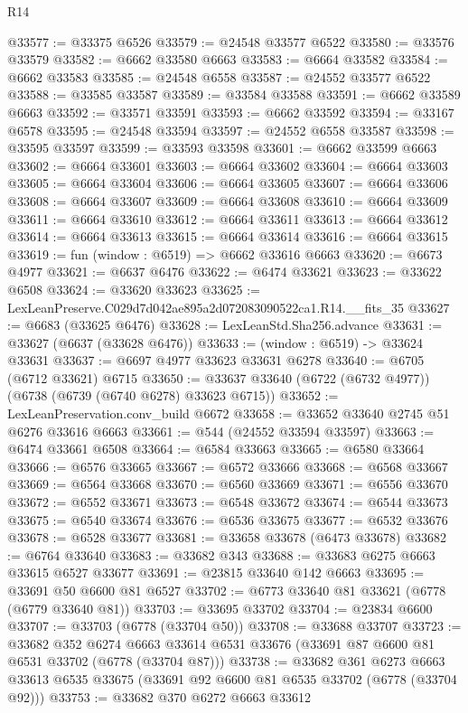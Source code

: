 \begin{lexlean}{R14}
\begin{coremodule}
@33577 := @33375 @6526
@33579 := @24548 @33577 @6522
@33580 := @33576 @33579
@33582 := @6662 @33580 @6663
@33583 := @6664 @33582
@33584 := @6662 @33583
@33585 := @24548 @6558
@33587 := @24552 @33577 @6522
@33588 := @33585 @33587
@33589 := @33584 @33588
@33591 := @6662 @33589 @6663
@33592 := @33571 @33591
@33593 := @6662 @33592
@33594 := @33167 @6578
@33595 := @24548 @33594
@33597 := @24552 @6558 @33587
@33598 := @33595 @33597
@33599 := @33593 @33598
@33601 := @6662 @33599 @6663
@33602 := @6664 @33601
@33603 := @6664 @33602
@33604 := @6664 @33603
@33605 := @6664 @33604
@33606 := @6664 @33605
@33607 := @6664 @33606
@33608 := @6664 @33607
@33609 := @6664 @33608
@33610 := @6664 @33609
@33611 := @6664 @33610
@33612 := @6664 @33611
@33613 := @6664 @33612
@33614 := @6664 @33613
@33615 := @6664 @33614
@33616 := @6664 @33615
@33619 := fun (window : @6519) => @6662 @33616 @6663
@33620 := @6673 @4977
@33621 := @6637 @6476
@33622 := @6474 @33621
@33623 := @33622 @6508
@33624 := @33620 @33623
@33625 := LexLeanPreserve.C029d7d042ae895a2d072083090522ca1.R14.__fits_35
@33627 := @6683 (@33625 @6476)
@33628 := LexLeanStd.Sha256.advance
@33631 := @33627 (@6637 (@33628 @6476))
@33633 := (window : @6519) -> @33624 @33631
@33637 := @6697 @4977 @33623 @33631 @6278
@33640 := @6705 (@6712 @33621) @6715
@33650 := @33637 @33640 (@6722 (@6732 @4977)) (@6738 (@6739 (@6740 @6278) @33623 @6715))
@33652 := LexLeanPreservation.conv_build @6672
@33658 := @33652 @33640 @2745 @51 @6276 @33616 @6663
@33661 := @544 (@24552 @33594 @33597)
@33663 := @6474 @33661 @6508
@33664 := @6584 @33663
@33665 := @6580 @33664
@33666 := @6576 @33665
@33667 := @6572 @33666
@33668 := @6568 @33667
@33669 := @6564 @33668
@33670 := @6560 @33669
@33671 := @6556 @33670
@33672 := @6552 @33671
@33673 := @6548 @33672
@33674 := @6544 @33673
@33675 := @6540 @33674
@33676 := @6536 @33675
@33677 := @6532 @33676
@33678 := @6528 @33677
@33681 := @33658 @33678 (@6473 @33678)
@33682 := @6764 @33640
@33683 := @33682 @343
@33688 := @33683 @6275 @6663 @33615 @6527 @33677
@33691 := @23815 @33640 @142 @6663
@33695 := @33691 @50 @6600 @81 @6527
@33702 := @6773 @33640 @81 @33621 (@6778 (@6779 @33640 @81))
@33703 := @33695 @33702
@33704 := @23834 @6600
@33707 := @33703 (@6778 (@33704 @50))
@33708 := @33688 @33707
@33723 := @33682
    @352
    @6274
    @6663
    @33614
    @6531
    @33676
    (@33691 @87 @6600 @81 @6531 @33702 (@6778 (@33704 @87)))
@33738 := @33682
    @361
    @6273
    @6663
    @33613
    @6535
    @33675
    (@33691 @92 @6600 @81 @6535 @33702 (@6778 (@33704 @92)))
@33753 := @33682
    @370
    @6272
    @6663
    @33612

\end{coremodule}
\end{lexlean}
